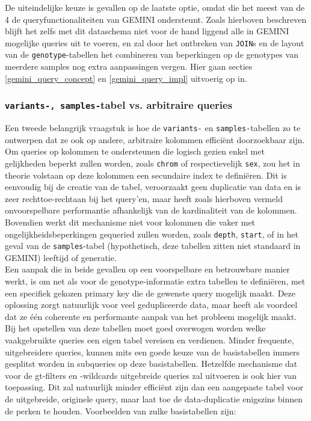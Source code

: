 De uiteindelijke keuze is gevallen op de laatste optie, omdat die het meest van de 4 de queryfunctionaliteiten van GEMINI ondersteunt. Zoals hierboven beschreven blijft het zelfs met dit dataschema niet voor de hand liggend alle in GEMINI mogelijke queries uit te voeren, en zal door het ontbreken van \texttt{JOIN}s en de layout van de \texttt{genotype}-tabellen het combineren van beperkingen op de genotypes van meerdere samples nog extra aanpassingen vergen. Hier gaan secties \ref{gemini_query_concept} en \ref{gemini_query_impl} uitvoerig op in.

\subsubsection{\texttt{variants-, samples-}tabel vs. arbitraire queries}
\label{arbitraire_queries}

Een tweede belangrijk vraagstuk is hoe de \texttt{variants-} en \texttt{samples-}tabellen zo te ontwerpen dat ze ook op andere, arbitraire kolommen effici\"ent doorzoekbaar zijn.\\
Om queries op kolommen te ondersteunen die logisch gezien enkel met gelijkheden beperkt zullen worden, zoals \texttt{chrom} of respectievelijk \texttt{sex}, zou het in theorie volstaan op deze kolommen een secundaire index te defini\"eren. Dit is eenvoudig bij de creatie van de tabel, veroorzaakt geen duplicatie van data en is zeer rechttoe-rechtaan bij het query'en, maar heeft zoals hierboven vermeld onvoorspelbare performantie afhankelijk van de kardinaliteit van de kolommen. Bovendien werkt dit mechanisme niet voor kolommen die vaker met ongelijkheidsbeperkingen gequeried zullen worden, zoals \texttt{depth}, \texttt{start}, of in het geval van de \texttt{samples}-tabel (hypothetisch, deze tabellen zitten niet standaard in GEMINI) leeftijd of generatie.\\

Een aanpak die in beide gevallen op een voorspelbare en betrouwbare manier werkt, is om net als voor de genotype-informatie extra tabellen te defini\"eren, met een specifiek gekozen primary key die de gewenste query mogelijk maakt. Deze oplossing zorgt natuurlijk voor veel gedupliceerde data, maar heeft als voordeel dat ze \'e\'en coherente en performante aanpak van het probleem mogelijk maakt. Bij het opstellen van deze tabellen moet goed overwogen worden welke vaakgebruikte queries een eigen tabel vereisen en verdienen. Minder frequente, uitgebreidere queries, kunnen mits een goede keuze van de basistabellen immers gesplitst worden in subqueries op deze basistabellen. Hetzelfde mechanisme dat voor de gt-filters en -wildcards uitgebreide queries zal uitvoeren is ook hier van toepassing. Dit zal natuurlijk minder effici\"ent zijn dan een aangepaste tabel voor de uitgebreide, originele query, maar laat toe de data-duplicatie enigszins binnen de perken te houden. Voorbeelden van zulke basistabellen zijn:


